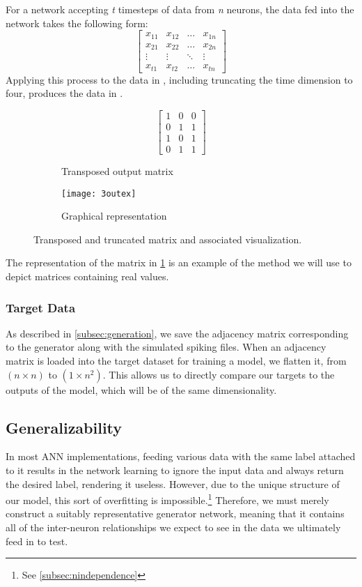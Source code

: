 For a network accepting \textit{t} timesteps of data from \textit{n} neurons, 
the data fed into the network takes the following form:
\[ \begin{bmatrix}
		x_{11} & x_{12} & \dots & x_{1n}\\
		x_{21} & x_{22} & \dots & x_{2n}\\
		\vdots & \vdots & \ddots & \vdots\\
		x_{t1} & x_{t2} & \dots & x_{tn}
	\end{bmatrix} \]
Applying this process to the data in , including truncating 
the time dimension to four, produces the data in .
\begin{figure}[H]
	\centering
	\begin{subfigure}{.48\textwidth}
		\[
			\begin{bmatrix}
				1 & 0 & 0\\
				0 & 1 & 1\\
				1 & 0 & 1\\
				0 & 1 & 1
			\end{bmatrix}
		\]
		\caption{Transposed output matrix}
	\end{subfigure}
	\begin{subfigure}{.48\textwidth}
		\centering
		\texttt{[image: 3outex]}
		\caption{Graphical representation}
		\label{subfig:3outexgraph}
	\end{subfigure}
	\caption{Transposed and truncated matrix and associated visualization.}
	\label{fig:data+vis}
\end{figure}\noindent
The representation of the matrix in \ref{subfig:3outexgraph} is an example of 
the method we will use to depict matrices containing real values.

\subsubsection{Target Data}
\label{subsubsec:targetdata}
As described in \ref{subsec:generation}, we save the adjacency matrix 
corresponding to the generator along with the simulated spiking files. When an 
adjacency matrix is loaded into the target dataset for training a model, we 
flatten it, from $(n \times n)$ to $(1 \times n^2)$. This allows us to directly 
compare our targets to the outputs of the model, which will be of the same 
dimensionality.

\subsection{Generalizability}
\label{subsec:hotswap}
In most ANN implementations, feeding various data with the same label attached 
to it results in the network learning to ignore the input data and always return 
the desired label, rendering it useless. However, due to the unique structure of 
our model, this sort of overfitting is impossible.\footnote{See 
\ref{subsec:nindependence}} Therefore, we must merely construct a suitably 
representative generator network, meaning that it contains all of the 
inter-neuron relationships we expect to see in the data we ultimately feed in to 
test.

